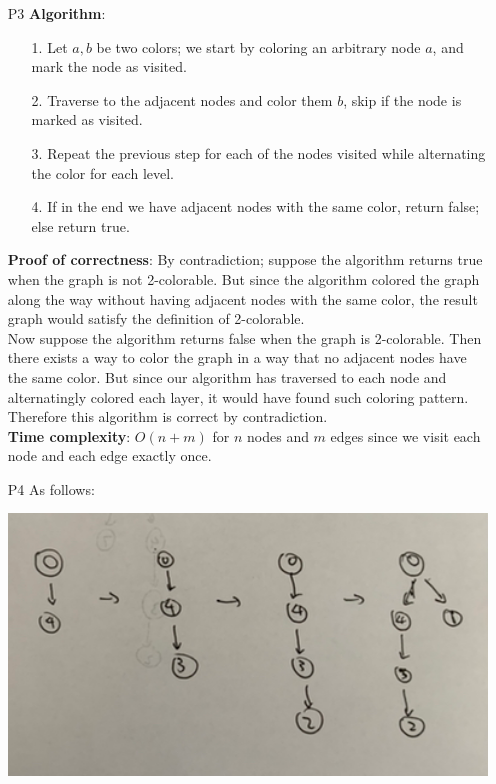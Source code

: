 \documentclass{article}
\begin{document}
\newpage
\begin{itemize}
    \item [P3]
          \textbf{Algorithm}:
          \begin{itemize}
              \item [1.] Let $a,b$ be two colors; we start by coloring an arbitrary node $a$, and mark the node as visited.
              \item [2.] Traverse to the adjacent nodes and color them $b$, skip if the node is marked as visited.
              \item [3.] Repeat the previous step for each of the nodes visited while alternating the color for each level.
              \item [4.] If in the end we have adjacent nodes with the same color, return false; else return true.
          \end{itemize}
          \textbf{Proof of correctness}: By contradiction; suppose the algorithm returns true when the graph is not 2-colorable. But since the algorithm colored the graph along the way without having adjacent nodes with the same color, the result graph would satisfy the definition of 2-colorable.\\
          Now suppose the algorithm returns false when the graph is 2-colorable. Then there exists a way to color the graph in a way that no adjacent nodes have the same color. But since our algorithm has traversed to each node and alternatingly colored each layer, it would have found such coloring pattern.\\
          Therefore this algorithm is correct by contradiction.\\
          \textbf{Time complexity}: $O(n+m)$ for $n$ nodes and $m$ edges since we visit each node and each edge exactly once.
\end{itemize}

\newpage
\begin{itemize}
    \item [P4] As follows:
    \begin{center}
        \includegraphics[width=6in]{p4.png}
    \end{center}
\end{itemize}
\end{document}
